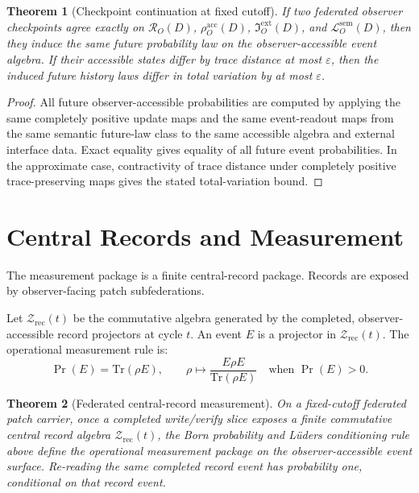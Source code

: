 \documentclass[11pt]{article}
\newtheorem{theorem}{Theorem}[section]
\theoremstyle{remark}
\theoremstyle{plain}
\begin{document}
\begin{theorem}[Checkpoint continuation at fixed cutoff]
If two federated observer checkpoints agree exactly on
\(\mathcal R_O(D)\), \(\rho_O^{\mathrm{acc}}(D)\), \(\mathfrak I_O^{\mathrm{ext}}(D)\), and
\(\mathcal L_O^{\mathrm{sem}}(D)\), then they induce the same future probability law on the observer-accessible
event algebra. If their accessible states differ by trace distance at most \(\varepsilon\), then
the induced future history laws differ in total variation by at most \(\varepsilon\).
\end{theorem}

\begin{proof}
All future observer-accessible probabilities are computed by applying the same completely
positive update maps and the same event-readout maps from the same semantic future-law class to the
same accessible algebra and external interface data. Exact equality gives equality of all future event probabilities. In the
approximate case, contractivity of trace distance under completely positive trace-preserving maps
gives the stated total-variation bound.
\end{proof}

\section{Central Records and Measurement}

The measurement package is a finite central-record package. Records are exposed by
observer-facing patch subfederations.

Let \(\mathcal Z_{\mathrm{rec}}(t)\) be the commutative algebra generated by the completed,
observer-accessible record projectors at cycle \(t\). An event \(E\) is a projector in
\(\mathcal Z_{\mathrm{rec}}(t)\). The operational measurement rule is:
\[
\Pr(E)=\mathrm{Tr}(\rho E),
\qquad
\rho\mapsto \frac{E\rho E}{\mathrm{Tr}(\rho E)}
\quad\text{when }\Pr(E)>0.
\]

\begin{theorem}[Federated central-record measurement]
On a fixed-cutoff federated patch carrier, once a completed write/verify slice exposes a finite
commutative central record algebra \(\mathcal Z_{\mathrm{rec}}(t)\), the Born probability and
L\"uders conditioning rule above define the operational measurement package on the
observer-accessible event surface. Re-reading the same completed record event has probability
one, conditional on that record event.
\end{theorem}
\end{document}

